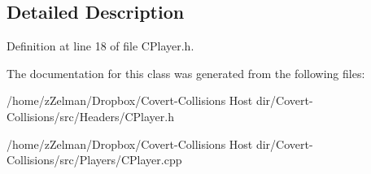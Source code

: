 \subsection{Detailed Description}


Definition at line 18 of file C\-Player.\-h.



The documentation for this class was generated from the following files\-:\begin{DoxyCompactItemize}
\item 
/home/z\-Zelman/\-Dropbox/\-Covert-\/\-Collisions Host dir/\-Covert-\/\-Collisions/src/\-Headers/C\-Player.\-h\item 
/home/z\-Zelman/\-Dropbox/\-Covert-\/\-Collisions Host dir/\-Covert-\/\-Collisions/src/\-Players/C\-Player.\-cpp\end{DoxyCompactItemize}
